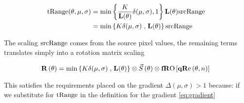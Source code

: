 \begin{equation}\label{eq:CombinedRotationRange}
\begin{aligned}
 \text{tRange}(\theta,\mu,\sigma) &= \min\left\{ \frac{K}{\mathbf{L}(\theta)}   \delta(\mu,\sigma) , 1 \right\} \mathbf{L}(\theta) \text{srcRange}  \\
  & =  \min\left\{K \delta(\mu,\sigma) \right. ,  \left. \mathbf{L}(\theta) \right\}  \text{srcRange}
\end{aligned}
\end{equation}

The scaling $\text{srcRange}$ comes from the source pixel values, the remaining terms translates simply into a rotation matrix scaling

\begin{equation*}
\R[\theta]   =  \min\left\{K \delta(\mu,\sigma) \right. ,  \left. \mathbf{L}(\theta) \right\} \otimes \Scale[\theta] \otimes \fRO \left[   \qRe[ \theta, n ] \right]   \\
\end{equation*}

This satisfies the requirements placed on the gradient $\Delta(\mu,\sigma)>1$ because: if we substitute for $\text{tRange}$ in the definition for the gradient \ref{eq:gradient}

